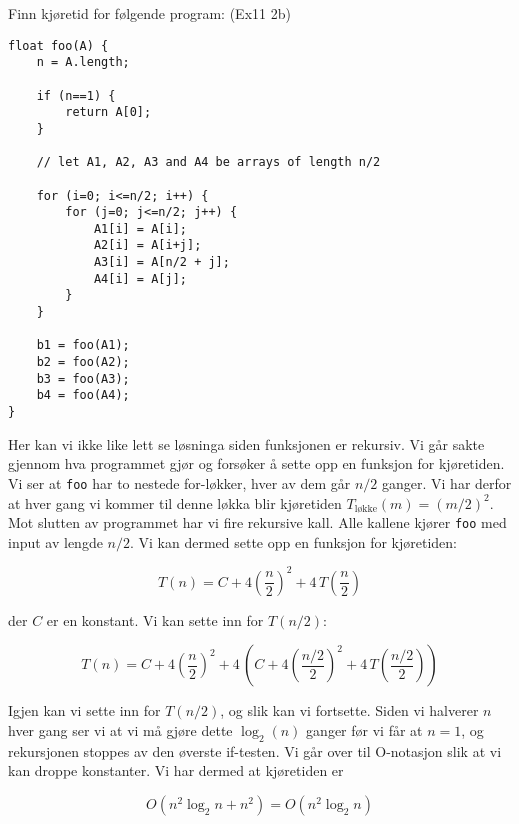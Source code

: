 \begin{eks} Finn kjøretid for følgende program: (Ex11 2b)
\begin{verbatim}
float foo(A) {
    n = A.length;
    
    if (n==1) {
        return A[0];
    }
    
    // let A1, A2, A3 and A4 be arrays of length n/2
    
    for (i=0; i<=n/2; i++) {
        for (j=0; j<=n/2; j++) {
            A1[i] = A[i];
            A2[i] = A[i+j];
            A3[i] = A[n/2 + j];
            A4[i] = A[j];
        }
    }
	
    b1 = foo(A1);
    b2 = foo(A2);
    b3 = foo(A3);
    b4 = foo(A4);
}
\end{verbatim}

Her kan vi ikke like lett se løsninga siden funksjonen er rekursiv. Vi går sakte gjennom hva programmet gjør og forsøker å sette opp en funksjon for kjøretiden. Vi ser at \verb|foo| har to nestede for-løkker, hver av dem går $ n/2 $ ganger. Vi har derfor at hver gang vi kommer til denne løkka blir kjøretiden $ T_{\text{løkke}}(m) = (m/2)^2 $. Mot slutten av programmet har vi fire rekursive kall. Alle kallene kjører \verb|foo| med input av lengde $ n/2 $. Vi kan dermed sette opp en funksjon for kjøretiden:

\[ T(n) = C + 4\left(\frac{n}{2}\right)^2 + 4\,T\left(\frac{n}{2}\right) \]

\noindent der $ C $ er en konstant.  Vi kan sette inn for $ T(n/2) $:

\[ T(n) = C + 4\left(\frac{n}{2}\right)^2 + 4\,\left(C + 4\left(\frac{n/2}{2}\right)^2 + 4\,T\left(\frac{n/2}{2}\right)\right)  \]

Igjen kan vi sette inn for $ T(n/2) $, og slik kan vi fortsette. Siden vi halverer $ n $ hver gang ser vi at vi må gjøre dette $ \log_2(n) $ ganger før vi får at $ n=1 $, og rekursjonen stoppes av den øverste if-testen. Vi går over til O-notasjon slik at vi kan droppe konstanter. Vi har dermed at kjøretiden er

\[ O\left(n^2\log_2 n + n^2\right) = O\left(n^2 \log_2 n\right) \]
\end{eks}